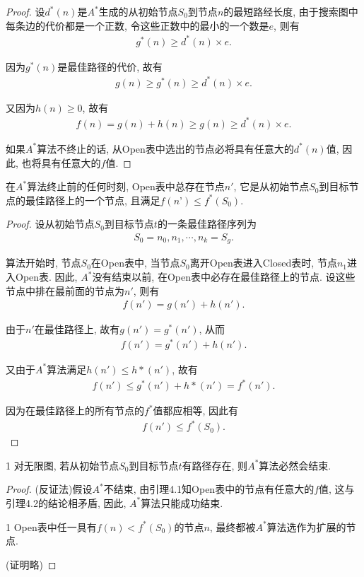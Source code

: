 \begin{proof}
设$d^*(n)$是$A^*$生成的从初始节点$S_0$到节点$n$的最短路经长度, 由于搜索图中每条边的代价都是一个正数, 令这些正数中的最小的一个数是$e$, 则有
\begin{align}
  g^*(n)\geq d^*(n)\times e.
\end{align}

因为$g^*(n)$是最佳路径的代价, 故有
\begin{align}
  g(n)\geq g^*(n)\geq d^*(n)\times e.
\end{align}

又因为$h(n)\geq 0$, 故有
\begin{align}
  f(n)=g(n)+h(n)\geq g(n)\geq d^*(n)\times e.
\end{align}

如果$A^*$算法不终止的话, 从Open表中选出的节点必将具有任意大的$d^*(n)$值, 因此, 也将具有任意大的$f$值.
\end{proof}
\begin{mylem}{}{}\label{AIlem002}
在$A^*$算法终止前的任何时刻, Open表中总存在节点$n'$, 它是从初始节点$S_0$到目标节点的最佳路径上的一个节点, 且满足$f(n’)\leq f^*(S_0)$.
\end{mylem}
\begin{proof}
设从初始节点$S_0$到目标节点$t$的一条最佳路径序列为
\begin{align}
  S_0= n_0, n_1, \cdots , n_k=S_g.
\end{align}

算法开始时, 节点$S_0$在Open表中, 当节点$S_0$离开Open表进入Closed表时, 节点$n_1$进入Open表. 因此, $A^*$没有结束以前, 在Open表中必存在最佳路径上的节点. 设这些节点中排在最前面的节点为$n'$, 则有
\begin{align}
  f(n')=g(n')+h(n').
\end{align}

由于$n'$在最佳路径上, 故有$g(n')=g^*(n')$, 从而
\begin{align}
  f(n')=g^*(n')+h(n').
\end{align}

又由于$A^*$算法满足$h(n')\leq h*(n')$, 故有
\begin{align}
  f(n')\leq g^*(n')+h*(n')=f^*(n').
\end{align}

因为在最佳路径上的所有节点的$f^*$值都应相等, 因此有
\begin{align}
  f(n')\leq f^*(S_0).
\end{align}
\end{proof}
\begin{mythm}{}{1}
对无限图, 若从初始节点$S_0$到目标节点$t$有路径存在, 则$A^*$算法必然会结束.
\end{mythm}
\begin{proof}
(反证法)假设$A^*$不结束, 由引理4.1知Open表中的节点有任意大的$f$值, 这与引理4.2的结论相矛盾, 因此, $A^*$算法只能成功结束.

\begin{myprop}{}{1}
  Open表中任一具有$f(n)<f^*(S_0)$的节点$n$, 最终都被$A^*$算法选作为扩展的节点.
\end{myprop}
(证明略)
\end{proof}

